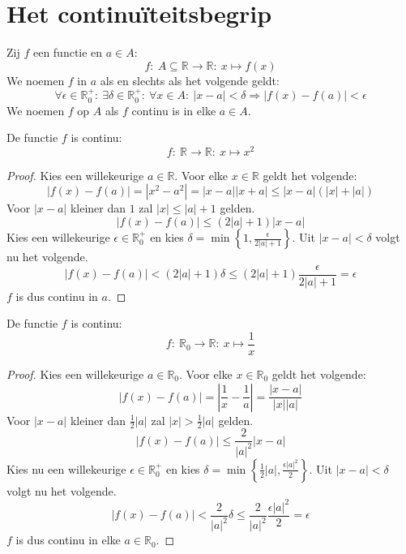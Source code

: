 \documentclass[main.tex]{subfiles}
\begin{document}
\section{Het continu\"iteitsbegrip}
\label{sec:het-cont}

\begin{de}
  Zij $f$ een functie en $a\in A$:
  \[ f:\ A \subseteq \mathbb{R} \rightarrow \mathbb{R}:\ x \mapsto f(x) \]
  We noemen $f$  in $a$ als en slechts als het volgende geldt:
  \[ \forall \epsilon \in \mathbb{R}_{0}^{+}:\ \exists \delta \in \mathbb{R}_{0}^{+}:\ \forall x\in A:\ |x-a| < \delta \Rightarrow |f(x) -f(a)| < \epsilon \]
  We noemen $f$  op $A$ als $f$ continu is in elke $a\in A$.
\end{de}


\begin{vb}
  De functie $f$ is continu:
  \[ f:\ \mathbb{R} \rightarrow \mathbb{R}:\ x \mapsto x^{2} \]

  \begin{proof}
    Kies een willekeurige $a \in \mathbb{R}$.
    Voor elke $x\in \mathbb{R}$ geldt het volgende:
    \[ |f(x)-f(a)| = |x^{2}-a^{2}| = |x-a||x+a| \le |x-a|(|x|+|a|) \]
    Voor $|x-a|$ kleiner dan $1$ zal $|x| \le |a|+1$ gelden.
    \[ |f(x)-f(a)| \le (2|a|+1)|x-a| \]
    Kies een willekeurige $\epsilon \in \mathbb{R}_{0}^{+}$ en kies $\delta = \min\left\{ 1, \frac{\epsilon}{2|a|+1} \right\}$.
    Uit $|x-a|< \delta$ volgt nu het volgende.
    \[ |f(x)-f(a)| < (2|a|+1)\delta \le (2|a|+1)\frac{\epsilon}{2|a|+1} = \epsilon \]
    $f$ is dus continu in $a$.
  \end{proof}
\end{vb}

\begin{vb}
  De functie $f$ is continu:
  \[ f:\ \mathbb{R}_{0} \rightarrow \mathbb{R}:\ x \mapsto \frac{1}{x} \]
  
  \begin{proof}
    Kies een willekeurige $a \in \mathbb{R}_{0}$.
    Voor elke $x \in \mathbb{R}_{0}$ geldt het volgende:
    \[ |f(x)-f(a)| = \left|\frac{1}{x}-\frac{1}{a}\right| = \frac{|x-a|}{|x||a|} \]
    Voor $|x-a|$ kleiner dan $\frac{1}{2}|a|$ zal $|x| > \frac{1}{2}|a|$ gelden.
    \[ |f(x)-f(a)| \le \frac{2}{|a|^{2}}|x-a| \]
    Kies nu een willekeurige $\epsilon \in \mathbb{R}_{0}^{+}$ en kies $\delta = \min\left\{ \frac{1}{2}|a|, \frac{\epsilon|a|^{2}}{2} \right\}$.
    Uit $|x-a|< \delta$ volgt nu het volgende.
    \[ |f(x)-f(a)| < \frac{2}{|a|^{2}}\delta \le \frac{2}{|a|^{2}}\frac{\epsilon|a|^{2}}{2} = \epsilon \]
    $f$ is dus continu in elke $a\in \mathbb{R}_{0}$.
  \end{proof}
\end{vb}
\end{document}
